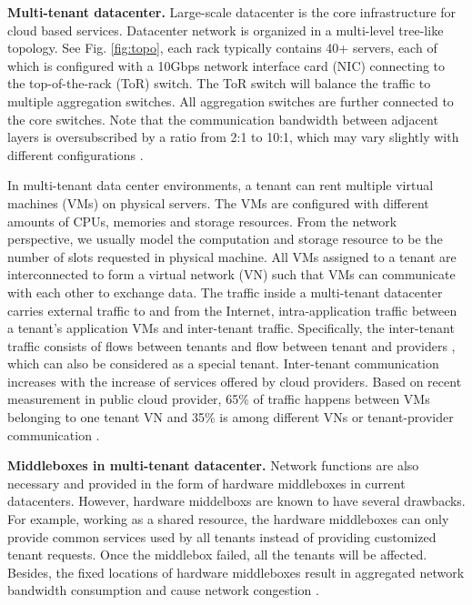 \documentclass[review]{elsarticle}
\begin{document}
\textbf{Multi-tenant datacenter. }
Large-scale datacenter is the core infrastructure for cloud based services. Datacenter network is organized in a multi-level tree-like topology. See Fig. \ref{fig:topo}, each rack typically contains 40+ servers, each of which is configured with a 10Gbps network interface card (NIC) connecting to the top-of-the-rack (ToR) switch. The ToR switch will balance the traffic to multiple aggregation switches. All aggregation switches are further connected to the core switches. Note that the communication bandwidth between adjacent layers is oversubscribed by a ratio from 2:1 to 10:1, which may vary slightly with different configurations \cite{B13cta, williamson2010has}.

In multi-tenant data center environments, a tenant can rent multiple virtual machines (VMs) on physical servers. The VMs are configured with different amounts of CPUs, memories and storage resources. From the network perspective, we usually model the computation and storage resource to be the number of slots requested in physical machine. All VMs assigned to a tenant are interconnected to form a virtual network (VN) such that VMs can communicate with each other to exchange data. The traffic inside a multi-tenant datacenter carries external traffic to and from the Internet, intra-application traffic between a tenant's application VMs and inter-tenant traffic. Specifically, the inter-tenant traffic consists of flows between tenants and flow between tenant and providers \cite{B13cta}, which can also be considered as a special tenant. Inter-tenant communication increases with the increase of services offered by cloud providers. Based on recent measurement in public cloud provider, 65\% of traffic happens between VMs belonging to one tenant VN and 35\% is among different VNs or tenant-provider communication \cite{B13cta, P13acs}.

\textbf{Middleboxes in multi-tenant datacenter. }
Network functions are also necessary and provided in the form of hardware middleboxes in current datacenters.  However, hardware middelboxs are known to have several drawbacks. For example, working as a shared resource, the hardware middleboxes can only provide common services used by all tenants instead of providing customized tenant requests. Once the middlebox failed, all the tenants will be affected. Besides, the fixed locations of hardware middleboxes result in aggregated network bandwidth consumption and cause network congestion \cite{ClickOS, Y15NFV}. 
\end{document}
